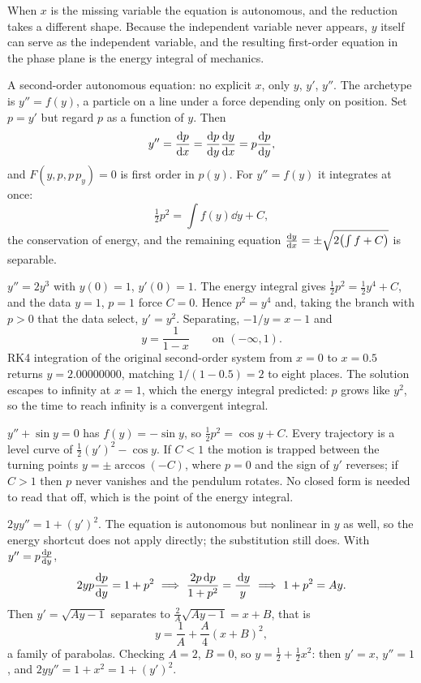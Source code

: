When $x$ is the missing variable the equation is autonomous, and the reduction takes a different shape. Because the independent variable never appears, $y$ itself can serve as the independent variable, and the resulting first-order equation in the phase plane is the energy integral of mechanics.

\cue A second-order autonomous equation: no explicit $x$, only $y$, $y'$, $y''$. The archetype is $y''=f(y)$, a particle on a line under a force depending only on position.
\method Set $p=y'$ but regard $p$ as a function of $y$. Then
\[y''=\frac{\mathrm{d}p}{\mathrm{d}x}=\frac{\mathrm{d}p}{\mathrm{d}y}\frac{\mathrm{d}y}{\mathrm{d}x}=p\frac{\mathrm{d}p}{\mathrm{d}y},\]
and $F(y,p,p\,p_y)=0$ is first order in $p(y)$. For $y''=f(y)$ it integrates at once:
\[\tfrac12p^{2}=\int f(y)\dd y+C,\]
the conservation of energy, and the remaining equation $\frac{\mathrm{d}y}{\mathrm{d}x}=\pm\sqrt{2\bigl(\int f+C\bigr)}$ is separable.

\begin{worked}
$y''=2y^{3}$ with $y(0)=1$, $y'(0)=1$. The energy integral gives $\tfrac12p^{2}=\tfrac12y^{4}+C$, and the data $y=1$, $p=1$ force $C=0$. Hence $p^{2}=y^{4}$ and, taking the branch with $p>0$ that the data select, $y'=y^{2}$. Separating, $-1/y=x-1$ and
\[y=\frac{1}{1-x}\qquad\text{on }(-\infty,1).\]
RK4 integration of the original second-order system from $x=0$ to $x=0.5$ returns $y=2.00000000$, matching $1/(1-0.5)=2$ to eight places. The solution escapes to infinity at $x=1$, which the energy integral predicted: $p$ grows like $y^{2}$, so the time to reach infinity is a convergent integral.
\end{worked}

\begin{worked}
$y''+\sin y=0$ has $f(y)=-\sin y$, so $\tfrac12p^{2}=\cos y+C$. Every trajectory is a level curve of $\tfrac12(y')^{2}-\cos y$. If $C<1$ the motion is trapped between the turning points $y=\pm\arccos(-C)$, where $p=0$ and the sign of $y'$ reverses; if $C>1$ then $p$ never vanishes and the pendulum rotates. No closed form is needed to read that off, which is the point of the energy integral.
\end{worked}

\begin{worked}[Not of the form $y''=f(y)$]
$2yy''=1+(y')^{2}$. The equation is autonomous but nonlinear in $y$ as well, so the energy shortcut does not apply directly; the substitution still does. With $y''=p\frac{\mathrm{d}p}{\mathrm{d}y}$,
\[2yp\dv{p}{y}=1+p^{2}\ \Longrightarrow\ \frac{2p\dd p}{1+p^{2}}=\frac{\dd y}{y}\ \Longrightarrow\ 1+p^{2}=Ay.\]
Then $y'=\sqrt{Ay-1}$ separates to $\tfrac2A\sqrt{Ay-1}=x+B$, that is
\[y=\frac1A+\frac{A}{4}(x+B)^{2},\]
a family of parabolas. Checking $A=2$, $B=0$, so $y=\tfrac12+\tfrac12x^{2}$: then $y'=x$, $y''=1$, and $2yy''=1+x^{2}=1+(y')^{2}$.
\end{worked}

